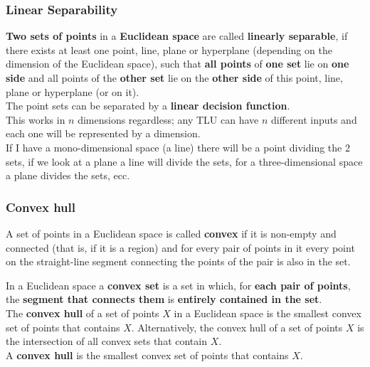 \newpage

\subsubsection{Linear Separability}
\textbf{Two sets of points} in a \textbf{Euclidean space} are called \textbf{linearly separable}, if there exists at least one point, line, plane or hyperplane (depending on the dimension of the Euclidean space), such that \textbf{all points} of \textbf{one set} lie on \textbf{one side} and all points of the \textbf{other set} lie on the \textbf{other side} of this point, line, plane or hyperplane (or on it).\\

The point sets can be separated by a \textbf{linear decision function}.\\

This works in $n$ dimensions regardless; any TLU can have $n$ different inputs and each one will be represented by a dimension.\\

If I have a mono-dimensional space (a line) there will be a point dividing the 2 sets, if we look at a plane a line will divide the sets, for a three-dimensional space a plane divides the sets, ecc.\\

\subsubsection{Convex hull}
A set of points in a Euclidean space is called \textbf{convex} if it is non-empty and connected (that is, if it is a region) and for every pair of points in it every point on the straight-line segment connecting the points of the pair is also in the set.

In a Euclidean space a \textbf{convex set} is a set in which, for \textbf{each pair of points}, the \textbf{segment that connects them} is \textbf{entirely contained in the set}.\\

The \textbf{convex hull} of a set of points $X$ in a Euclidean space is the smallest convex set of points that contains $X$. Alternatively, the convex hull of a set of points $X$ is the intersection of all convex sets that contain $X$.\\

A \textbf{convex hull} is the smallest convex set of points that contains $X$.\\

